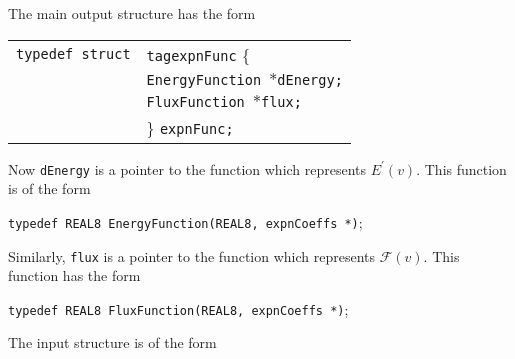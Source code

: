\documentclass[12pt]{article}
\begin{document}
The main output structure has the form

\vspace{5mm}

\begin{tabular}{ll}
\texttt{typedef struct} & \texttt{tagexpnFunc} \{ \\
                        & \texttt{EnergyFunction $\ast$dEnergy;}  \\
                        & \texttt{FluxFunction $\ast$flux;}  \\
                        & \} \texttt{expnFunc;}
\end{tabular}

\vspace{5mm}

Now \texttt{dEnergy} is a pointer to the function which represents $E^{\prime}(v)$. This function is of the form

\vspace{5mm}

\texttt{typedef REAL8 EnergyFunction(REAL8, expnCoeffs *)};

\vspace{5mm}

Similarly, \texttt{flux} is a pointer to the function which represents $\mathcal{F}(v)$. This function has the form

\vspace{5mm}

\texttt{typedef REAL8 FluxFunction(REAL8, expnCoeffs *)};

\vspace{5mm}

The input structure is of the form

\vspace{5mm}
\end{document}
